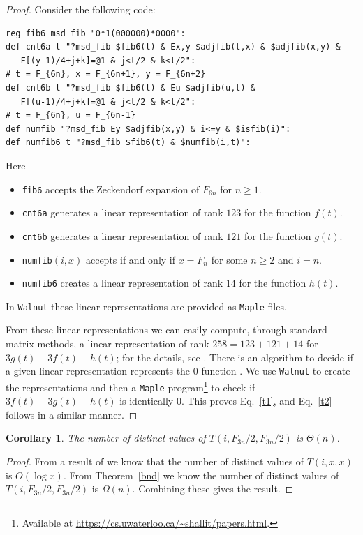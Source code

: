 \documentclass[final]{dmtcs-episciences}
\theoremstyle{plain}
\newtheorem{corollary}[theorem]{Corollary}
\theoremstyle{remark}
\begin{document}
\begin{proof}
Consider the following code:
\begin{verbatim}
reg fib6 msd_fib "0*1(000000)*0000":
def cnt6a t "?msd_fib $fib6(t) & Ex,y $adjfib(t,x) & $adjfib(x,y) & 
   F[(y-1)/4+j+k]=@1 & j<t/2 & k<t/2":
# t = F_{6n}, x = F_{6n+1}, y = F_{6n+2}
def cnt6b t "?msd_fib $fib6(t) & Eu $adjfib(u,t) & 
   F[(u-1)/4+j+k]=@1 & j<t/2 & k<t/2":
# t = F_{6n}, u = F_{6n-1}
def numfib "?msd_fib Ey $adjfib(x,y) & i<=y & $isfib(i)":
def numfib6 t "?msd_fib $fib6(t) & $numfib(i,t)":
\end{verbatim}
Here
\begin{itemize}
\item {\tt fib6} accepts the Zeckendorf expansion of $F_{6n}$ for $n \geq 1$.
\item {\tt cnt6a} generates a linear representation of rank $123$ for the function $f(t)$.
\item {\tt cnt6b}
generates a linear representation of rank $121$ for the function $g(t)$.
\item {\tt numfib}$(i,x)$ accepts if and only
if $x = F_n$ for some $n \geq 2$ and $i=n$.
\item {\tt numfib6} creates a linear representation of rank $14$ for the function $h(t)$.
\end{itemize}
In {\tt Walnut} these linear representations are provided as {\tt Maple} files.

From these linear representations we can easily compute, through standard matrix methods, a linear representation of rank $258 = 123 + 121 + 14$ for
$3g(t) - 3f(t) - h(t)$; for the details, see \citet[\S 4.10]{Shallit:2023}. There is an algorithm to decide
if a given linear representation represents the $0$ function \citep{Berstel&Reutenauer:2011}.  We use {\tt Walnut} to create the representations and then a {\tt Maple} program\footnote{Available at \url{https://cs.uwaterloo.ca/~shallit/papers.html}.} to check if $3f(t)-3g(t)-h(t)$ is identically $0$. 
This proves Eq.~\eqref{t1}, and Eq.~\eqref{t2} follows in a similar manner.
\end{proof}

\begin{corollary}
The number of distinct values of $T(i, F_{3n}/2, F_{3n}/2)$ is
$\Theta(n)$.
\end{corollary}
\begin{proof}
From a result of
\cite{Berthe} we know that the number of distinct values of
$T(i,x,x)$ is $O(\log x)$.  From Theorem~\ref{bnd} we know the number of distinct values of $T(i, F_{3n}/2, F_{3n}/2)$ is $\Omega(n)$.  Combining these gives the result.
\end{proof}
\end{document}
